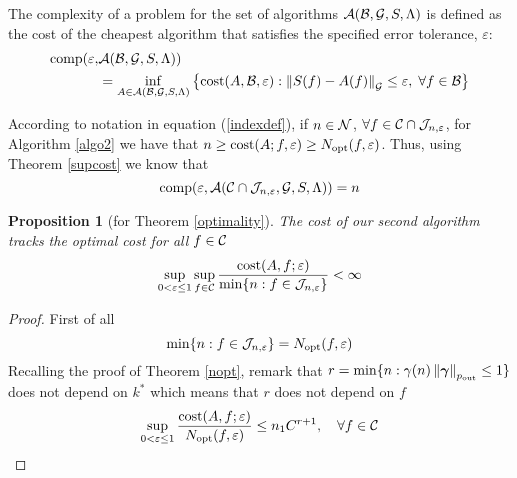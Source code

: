 \documentclass[final]{elsarticle}
\newcommand{\pout}{p_{\text{\rm{out}}}}
\newcommand{\bgamma}{\boldsymbol\gamma}
\newtheorem{prop}[theorem]{Proposition}
\theoremstyle{definition}
\theoremstyle{remark}
\begin{document}
The complexity of a problem for the set of algorithms $\ca(\cb,\cg,S,\Lambda)$ is defined as the cost of the cheapest algorithm that satisfies the specified error tolerance, $\varepsilon$:
\begin{equation}\label{complexity2}
\begin{aligned}
\comp(\varepsilon,&\ca(\cb,\cg,S,\Lambda))\\
&=\inf_{A\in\ca(\cb,\cg,S,\Lambda)}\left\{\cost(A,\cb,\varepsilon):\norm[\cg]{S(f)-A(f)}\le\varepsilon,\; \forall f\in\cb\right\}
\end{aligned}
\end{equation}

According to notation in equation (\ref{indexdef}), if $n\in\cn$, $\forall f\in\cc\cap\cj_{n,\varepsilon}$, for Algorithm \ref{algo2} we have that $n\ge\cost(A;f,\varepsilon)\ge N_{\opt}(f,\varepsilon)$. Thus, using Theorem \ref{supcost} we know that
\begin{equation*}
\comp(\varepsilon,\ca(\cc\cap\cj_{n,\varepsilon},\cg,S,\Lambda))=n
\end{equation*}

\begin{prop}[for Theorem \ref{optimality}]\label{optimcost}
The cost of our second algorithm tracks the optimal cost for all $f\in\cc$
\begin{equation*}
\sup_{0 < \varepsilon \le 1}\sup_{f\in\cc} \frac{\cost(A,f;\varepsilon)} {\min\{n:f\in\cj_{n,\varepsilon}\}} <\infty
\end{equation*}
\end{prop}
\begin{proof}
First of all
\begin{equation*}
\min\{n:f\in\cj_{n,\varepsilon}\}=N_{\opt}(f,\varepsilon)
\end{equation*}
Recalling the proof of Theorem \ref{nopt}, remark that $r=\min\{n: \gamma(n)\norm[\pout]{\bgamma} \le 1\}$ does not depend on $k^*$ which means that $r$ does not depend on $f$
\begin{equation*}
\sup_{0 < \varepsilon \le 1} \frac{\cost(A,f;\varepsilon)} {N_{\opt}(f,\varepsilon)} \le n_1C^{r+1},\quad\forall f\in\cc
\end{equation*}
\end{proof}
\end{document}
